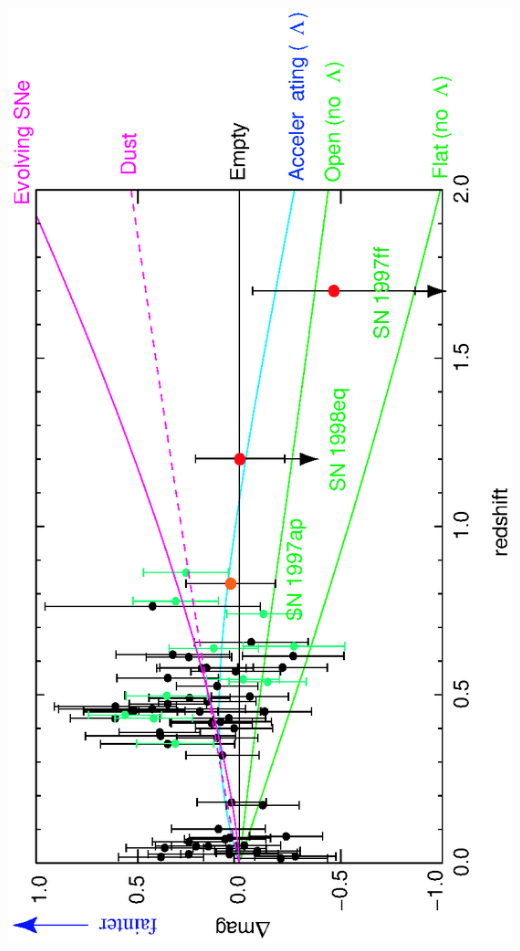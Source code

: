 \documentclass[12pt]{article}
\begin{document}
\begin{minipage}{\linewidth}
  \vspace{-1.5 cm}
  \hspace{0 cm} \includegraphics[width=0.8\linewidth, angle=180]{scp_systematics.eps}
  \vspace{-5 cm}
\end{minipage}
\end{document}
